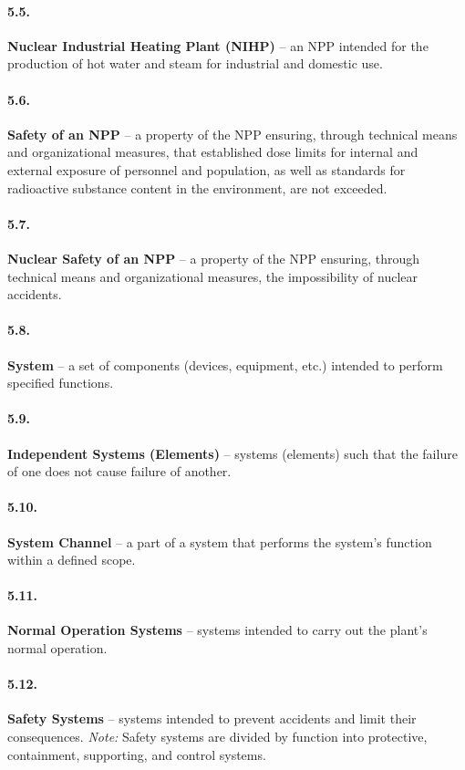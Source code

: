 \documentclass[openright]{bookest}
\begin{document}
\paragraph{5.5.}
\textbf{Nuclear Industrial Heating Plant (NIHP)} -- an NPP intended for the production of hot water and steam for industrial and domestic use.

\paragraph{5.6.}
\textbf{Safety of an NPP} -- a property of the NPP ensuring, through technical means and organizational measures, that established dose limits for internal and external exposure of personnel and population, as well as standards for radioactive substance content in the environment, are not exceeded.

\paragraph{5.7.}
\textbf{Nuclear Safety of an NPP} -- a property of the NPP ensuring, through technical means and organizational measures, the impossibility of nuclear accidents.

\paragraph{5.8.}
\textbf{System} -- a set of components (devices, equipment, etc.) intended to perform specified functions.

\paragraph{5.9.}
\textbf{Independent Systems (Elements)} -- systems (elements) such that the failure of one does not cause failure of another.

\paragraph{5.10.}
\textbf{System Channel} -- a part of a system that performs the system's function within a defined scope.

\paragraph{5.11.}
\textbf{Normal Operation Systems} -- systems intended to carry out the plant's normal operation.

\paragraph{5.12.}
\textbf{Safety Systems} -- systems intended to prevent accidents and limit their consequences.  
\textit{Note:} Safety systems are divided by function into protective, containment, supporting, and control systems.
\end{document}
